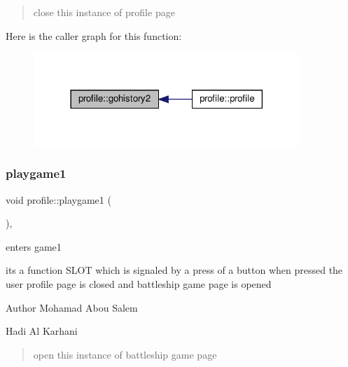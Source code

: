 \begin{quote}
close this instance of profile page \end{quote}
Here is the caller graph for this function\+:
\nopagebreak
\begin{figure}[H]
\begin{center}
\leavevmode
\includegraphics[width=285pt]{classprofile_ae4957e01d43effcf134009d1e302d166_icgraph}
\end{center}
\end{figure}
\mbox{\label{classprofile_a6255c697ba58203b5d9834fea1329cb1}} 
\subsubsection{\texorpdfstring{playgame1}{playgame1}}
{\footnotesize\ttfamily void profile\+::playgame1 (\begin{DoxyParamCaption}{ }\end{DoxyParamCaption})\hspace{0.3cm}{\ttfamily [private]}, {\ttfamily [slot]}}



enters game1 

its a function S\+L\+OT which is signaled by a press of a button when pressed the user profile page is closed and battleship game page is opened

\begin{DoxyAuthor}{Author}
Mohamad Abou Salem 

Hadi Al Karhani 
\end{DoxyAuthor}
\begin{quote}
open this instance of battleship game page \end{quote}


